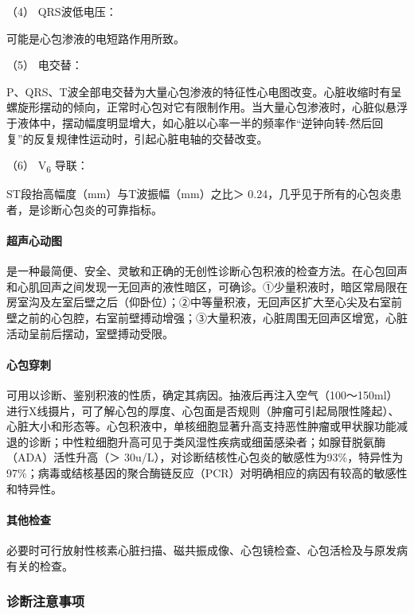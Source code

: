 \hypertarget{text00302.htmlux5cux23CHP10-4-2-2-3-4}{}
（4） QRS波低电压：

可能是心包渗液的电短路作用所致。

\hypertarget{text00302.htmlux5cux23CHP10-4-2-2-3-5}{}
（5） 电交替：

P、QRS、T波全部电交替为大量心包渗液的特征性心电图改变。心脏收缩时有呈螺旋形摆动的倾向，正常时心包对它有限制作用。当大量心包渗液时，心脏似悬浮于液体中，摆动幅度明显增大，如心脏以心率一半的频率作“逆钟向转-然后回复”的反复规律性运动时，引起心脏电轴的交替改变。

\hypertarget{text00302.htmlux5cux23CHP10-4-2-2-3-6}{}
（6） V\textsubscript{6} 导联：

ST段抬高幅度（mm）与T波振幅（mm）之比＞
0.24，几乎见于所有的心包炎患者，是诊断心包炎的可靠指标。

\paragraph{超声心动图}

是一种最简便、安全、灵敏和正确的无创性诊断心包积液的检查方法。在心包回声和心肌回声之间发现一无回声的液性暗区，可确诊。①少量积液时，暗区常局限在房室沟及左室后壁之后（仰卧位）；②中等量积液，无回声区扩大至心尖及右室前壁之前的心包腔，右室前壁搏动增强；③大量积液，心脏周围无回声区增宽，心脏活动呈前后摆动，室壁搏动受限。

\paragraph{心包穿刺}

可用以诊断、鉴别积液的性质，确定其病因。抽液后再注入空气（100～150ml）进行X线摄片，可了解心包的厚度、心包面是否规则（肿瘤可引起局限性隆起）、心脏大小和形态等。心包积液中，单核细胞显著升高支持恶性肿瘤或甲状腺功能减退的诊断；中性粒细胞升高可见于类风湿性疾病或细菌感染者；如腺苷脱氨酶（ADA）活性升高（＞
30u/L），对诊断结核性心包炎的敏感性为93\%，特异性为97\%；病毒或结核基因的聚合酶链反应（PCR）对明确相应的病因有较高的敏感性和特异性。

\paragraph{其他检查}

必要时可行放射性核素心脏扫描、磁共振成像、心包镜检查、心包活检及与原发病有关的检查。

\subsubsection{诊断注意事项}

